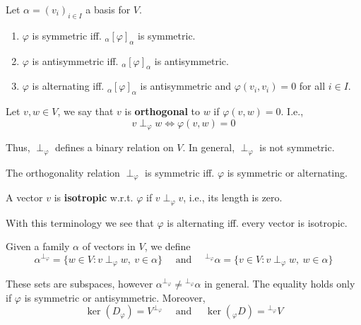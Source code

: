 \begin{theorem}
  Let $\alpha = (v_i)_{i \in I}$ a basis for $V$. 
  \begin{enumerate}
    \item $\varphi$ is symmetric iff. ${}_\alpha [\varphi]_\alpha$ is symmetric. 
    \item $\varphi$ is antisymmetric iff. ${}_\alpha [\varphi]_\alpha$ is antisymmetric. 
    \item $\varphi$ is alternating iff. ${}_\alpha [\varphi]_\alpha$ is antisymmetric and $\varphi(v_i, v_i) = 0$ for all $i \in I$.
  \end{enumerate}
\end{theorem}

\begin{definition}[Orthogonality]
  Let $v, w \in V$, we say that $v$ is \textbf{orthogonal} to $w$ if $\varphi(v,w) = 0$. I.e.,
\[
  v \perp_\varphi w \iff \varphi(v,w) = 0
\]
\end{definition}

Thus, $\perp_\varphi$ defines a binary relation on $V$. In general, $\perp_\varphi$ is not symmetric. 

\begin{theorem}\label{thm:202212291346}
  The orthogonality relation $\perp_\varphi$ is symmetric iff. $\varphi$ is symmetric or alternating. 
\end{theorem}

\begin{definition}[Isotropic]  
  A vector $v$ is \textbf{isotropic} w.r.t. $\varphi$ if $v \perp_\varphi v$, i.e., its length is zero. 
\end{definition}

With this terminology we see that $\varphi$ is alternating iff. every vector is isotropic.

\begin{definition}
Given a family $\alpha$ of vectors in $V$, we define 
\[
  \alpha^{\perp_\varphi} = \{ w \in V : v \perp_\varphi w, ~v \in \alpha \} \quad \text{ and } \quad {}^{\perp_\varphi} \alpha = \{ v \in V : v \perp_\varphi w, ~w \in \alpha \}
\]
\end{definition}

These sets are subspaces, however $\alpha^{\perp_\varphi} \neq {}^{\perp_\varphi} \alpha$ in general. The equality holds only if $\varphi$ is symmetric or antisymmetric. Moreover, 
\[
  \ker(D_\varphi) = V^{\perp_\varphi} \quad \text{ and } \quad \ker({}_\varphi D) = {}^{\perp_\varphi} V
\]

